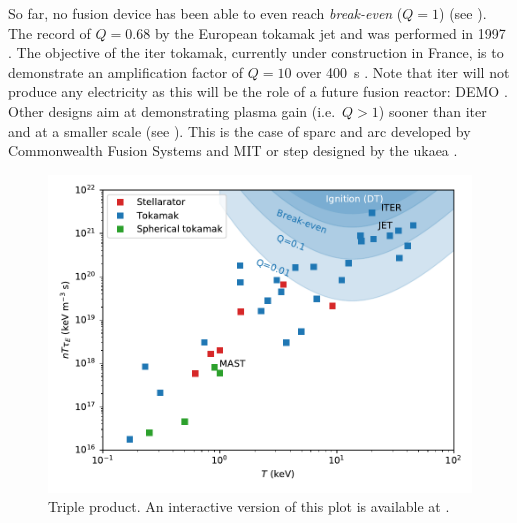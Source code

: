 So far, no fusion device has been able to even reach \textit{break-even} ($Q = 1$) (see ).
The record of $Q = 0.68$ by the European \gls{tokamak} \gls{jet} and was performed in 1997 .
The objective of the \gls{iter} \gls{tokamak}, currently under construction in France, is to demonstrate an amplification factor of $Q=10$ over \SI{400}{s} . 
Note that \acrshort{iter} will not produce any electricity as this will be the role of a future fusion reactor: DEMO .
Other designs aim at demonstrating \gls{plasma} gain (i.e.\ $Q > 1$) sooner than \acrshort{iter} and at a smaller scale (see ).
This is the case of \acrshort{sparc} and \acrshort{arc} developed by Commonwealth Fusion Systems and MIT  or \acrshort{step} designed by the \gls{ukaea} .

\begin{figure}
    \centering
    \includegraphics[width=\linewidth]{Figures/Chapter1/triple_product_vs_T.pdf}
    \caption{Triple product. An interactive version of this plot is available at \cite{delaporte-mathurin_remdelaportemathurinfusion-world_2022}.}
\end{figure}

